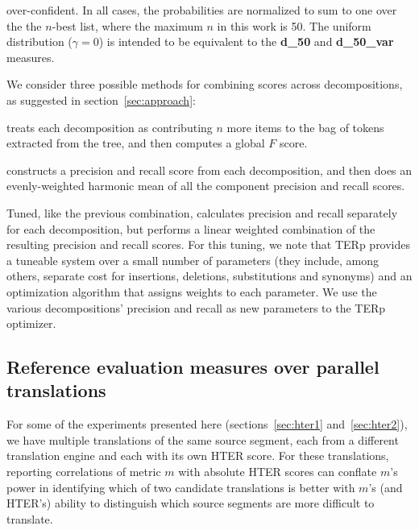\documentclass{kluwer}    %
\begin{document}
\begin{article}
\begin{description}
  over-confident.  In all cases, the probabilities are normalized to
  sum to one over the the $n$-best list, where the maximum $n$ in this
  work is 50.  The uniform distribution ($\gamma = 0$) is intended to
  be equivalent to the \cite{owczarzak07labelleddepseval}
  \textbf{d\_50} and \textbf{d\_50\_var} measures.
\item[Score combination.] We consider three possible methods for
  combining scores across decompositions, as suggested in
  section~\ref{sec:approach}:
  \begin{description}
  \item[$F\lbrack\cdot\rbrack$] treats each decomposition as
    contributing $n$ more items to the bag of tokens extracted from
    the tree, and then computes a global $F$ score.
  \item[$\mu_{PR}\lbrack\cdot\rbrack$] constructs a precision and
    recall score from each decomposition, and then does an
    evenly-weighted harmonic mean of all the component precision and
    recall scores.
  \item Tuned, like the previous combination, calculates precision and
    recall separately for each decomposition, but performs a linear
    weighted combination of the resulting precision and recall scores.
    For this tuning, we note that TERp \cite{snover09terp} provides a
    tuneable system over a small number of parameters (they include,
    among others, separate cost for insertions, deletions,
    substitutions and synonyms) and an optimization algorithm that
    assigns weights to each parameter. We use the various
    decompositions' precision and recall as new parameters to the TERp
    optimizer.
  \end{description}
\end{description}

\subsection{Reference evaluation measures over parallel translations}
\label{sec:metricsreference}
For some of the experiments presented here (sections~\ref{sec:hter1}
and~\ref{sec:hter2}), we have multiple translations of the same source
segment, each from a different translation engine and each with its
own HTER score.  For these translations, reporting correlations of
metric $m$ with absolute HTER scores can conflate $m$'s power in
identifying which of two candidate translations is better with $m$'s
(and HTER's) ability to distinguish which source segments are more
difficult to translate.


\end{article}
\end{document}
